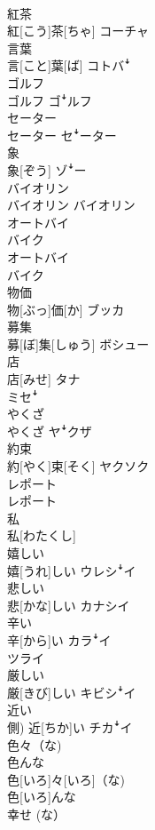 \documentclass[8pt]{extreport}
\begin{document}
\begin{CJK}{UTF8}{min}
\\	紅茶	
\\	紅[こう]茶[ちゃ]	コーチャ
\\	言葉	
\\	言[こと]葉[ば]	コトバꜜ
\\	ゴルフ	
\\	ゴルフ	ゴꜜルフ
\\	セーター	
\\	セーター	セꜜーター
\\	象	
\\	象[ぞう]	ゾꜜー
\\	バイオリン	
\\	バイオリン	バイオリン
\\	オートバイ 
\\	バイク	
\\	オートバイ 
\\	バイク	
\\	物価	
\\	物[ぶっ]価[か]	ブッカ
\\	募集	
\\	募[ぼ]集[しゅう]	ボシュー
\\	店	
\\	店[みせ]	タナ 
\\	ミセꜜ
\\	やくざ	
\\	やくざ	ヤꜜクザ
\\	約束	
\\	約[やく]束[そく]	ヤクソク
\\	レポート	
\\	レポート	
\\	私 
\\	私[わたくし] 
\\	嬉しい	
\\	嬉[うれ]しい	ウレシꜜイ
\\	悲しい	
\\	悲[かな]しい	カナシイ
\\	辛い	
\\	辛[から]い	カラꜜイ 
\\	ツライ
\\	厳しい	
\\	厳[きび]しい	キビシꜜイ
\\	近い	
\\	側)	近[ちか]い	チカꜜイ
\\	色々（な) 
\\	色んな	
\\	色[いろ]々[いろ]（な) 
\\	色[いろ]んな	
\\	幸せ (な）	

\end{CJK}
\end{document}
